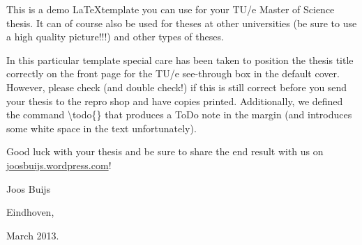This is a demo \LaTeX template you can use for your TU/e Master of Science thesis.
It can of course also be used for theses at other universities (be sure to use a high quality picture!!!) and other types of theses.

In this particular template special care has been taken to position the thesis title correctly on the front page for
the TU/e see-through box in the default cover. However, please check (and double check!) if this is still correct before you send your thesis to the repro shop and have copies printed. Additionally, we defined the command \textbackslash todo\{\} that produces a  ToDo note in the margin (and introduces some white space in the text unfortunately).

Good luck with your thesis and be sure to share the end result with us on \url{joosbuijs.wordpress.com}!

\vspace{10pt}

Joos Buijs

Eindhoven,

March 2013.